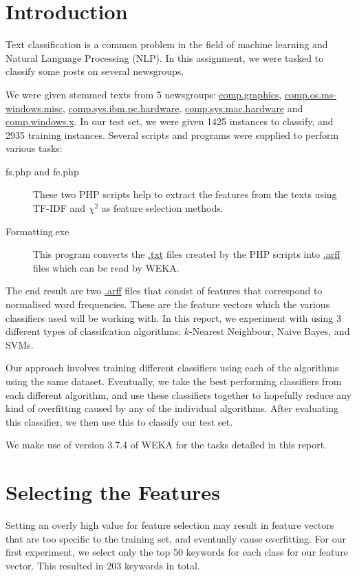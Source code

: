 \documentclass[12pt]{article}
\begin{document}
\maketitle
\section{Introduction}
Text classification is a common problem in the field of machine learning and Natural Language Processing (NLP). In this assignment, we were tasked to classify some posts on several newsgroups.

We were given stemmed texts from 5 newsgroups: \url{comp.graphics}, \url{comp.os.ms-windows.misc}, \url{comp.sys.ibm.pc.hardware}, \url{comp.sys.mac.hardware} and \url{comp.windows.x}. In our test set, we were given 1425 instances to classify, and 2935 training instances. Several scripts and programs were supplied to perform various tasks:
\begin{description}
	\item[fs.php and fe.php] These two PHP scripts help to extract the features from the texts using \textsc{TF-IDF} and $\chi^2$ as feature selection methods.
	\item[Formatting.exe] This program converts the \url{.txt} files created by the PHP scripts into \url{.arff} files which can be read by WEKA.
\end{description}
The end result are two \url{.arff} files that consist of features that correspond to normalised word frequencies. These are the feature vectors which the various classifiers used will be working with. In this report, we experiment with using 3 different types of classifcation algorithms: $k$-Nearest Neighbour, Naive Bayes, and SVMs. 

Our approach involves training different classifiers using each of the algorithms using the same dataset. Eventually, we take the best performing classifiers from each different algorithm, and use these classifiers together to hopefully reduce any kind of overfitting caused by any of the individual algorithms. After evaluating this classifier, we then use this to classify our test set.

We make use of version 3.7.4 of WEKA for the tasks detailed in this report.

\section{Selecting the Features}
 Setting an overly high value for feature selection may result in feature vectors that are too specific to the training set, and eventually cause overfitting. For our first experiment, we select only the top 50 keywords for each class for our feature vector. This resulted in 203 keywords in total.
\end{document}
